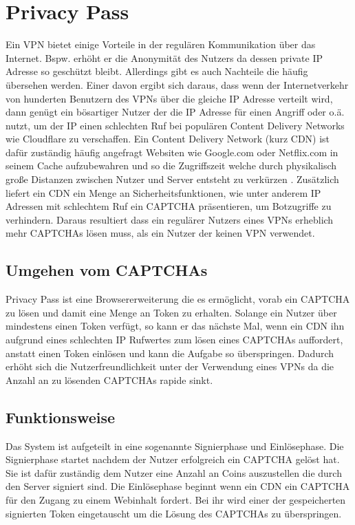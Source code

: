 \documentclass[11pt,a4paper]{scrreprt}
\begin{document}
\section{Privacy Pass}
\label{sec:privacy-pass}
Ein VPN bietet einige Vorteile in der regulären Kommunikation über das Internet. Bspw. erhöht er die Anonymität des Nutzers da dessen private IP Adresse so geschützt bleibt. Allerdings gibt es auch Nachteile die häufig übersehen werden. Einer davon ergibt sich daraus, dass wenn der Internetverkehr von hunderten Benutzern des VPNs über die gleiche IP Adresse verteilt wird, dann genügt ein  bösartiger Nutzer der die IP Adresse für einen Angriff oder o.ä. nutzt, um der IP einen schlechten Ruf bei populären Content Delivery Networks wie Cloudflare zu verschaffen. Ein Content Delivery Network (kurz CDN) ist dafür zuständig häufig angefragt Websiten wie Google.com oder Netflix.com in seinem Cache aufzubewahren und so die Zugriffszeit welche durch physikalisch große Distanzen zwischen Nutzer und Server entsteht zu verkürzen \cite{pp-cdn}. Zusätzlich liefert ein CDN ein Menge an Sicherheitsfunktionen, wie unter anderem IP Adressen mit schlechtem Ruf ein CAPTCHA präsentieren, um Botzugriffe zu verhindern. Daraus resultiert dass ein regulärer Nutzers eines VPNs erheblich mehr CAPTCHAs lösen muss, als ein Nutzer der keinen VPN verwendet.

\subsection{Umgehen vom CAPTCHAs}
Privacy Pass ist eine Browsererweiterung die es ermöglicht, vorab ein CAPTCHA zu lösen und damit eine Menge an Token zu erhalten. Solange ein Nutzer über mindestens einen Token verfügt, so kann er das nächste Mal, wenn ein CDN ihn aufgrund eines schlechten IP Rufwertes zum lösen eines CAPTCHAs auffordert, anstatt einen Token einlösen und kann die Aufgabe so überspringen. Dadurch erhöht sich die Nutzerfreundlichkeit unter der Verwendung eines VPNs da die Anzahl an zu lösenden CAPTCHAs rapide sinkt. \cite{pp-davidson2018privacy}

\subsection{Funktionsweise}
Das System ist aufgeteilt in eine sogenannte Signierphase und Einlösephase. Die Signierphase startet nachdem der Nutzer erfolgreich ein CAPTCHA gelöst hat. Sie ist dafür zuständig dem Nutzer eine Anzahl an Coins auszustellen die durch den Server signiert sind. Die Einlösephase beginnt wenn ein CDN ein CAPTCHA für den Zugang zu einem Webinhalt fordert. Bei ihr wird einer der gespeicherten signierten Token eingetauscht um die Lösung des CAPTCHAs zu überspringen. 
\end{document}
